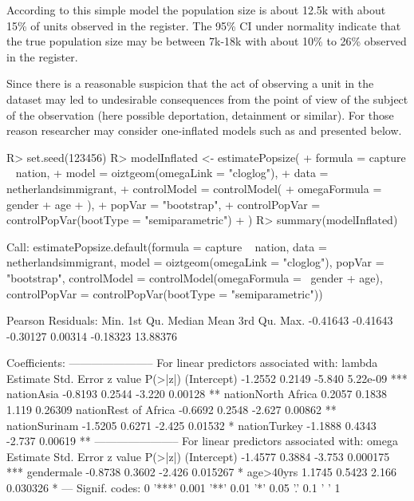 \documentclass[
]{jss}
\newcommand{\1}{\mathcal{I}} \newcommand{\bZero}{\boldsymbol{0}}
\begin{document}
According to this simple model the population size is about 12.5k with
about 15\% of units observed in the register. The 95\% CI under
normality indicate that the true population size may be between 7k-18k
with about 10\% to 26\% observed in the register.

Since there is a reasonable suspicion that the act of observing a unit
in the dataset may led to undesirable consequences from the point of
view of the subject of the observation (here possible deportation,
detainment or similar). For those reason researcher may consider
one-inflated models such as  and presented below.

\begin{CodeChunk}
\begin{CodeInput}
R> set.seed(123456)
R> modelInflated <- estimatePopsize(
+     formula = capture ~ nation,
+     model   = oiztgeom(omegaLink = "cloglog"),
+     data    = netherlandsimmigrant,
+     controlModel = controlModel(
+         omegaFormula = ~ gender + age
+     ),
+     popVar = "bootstrap",
+     controlPopVar = controlPopVar(bootType = "semiparametric")
+ )
R> summary(modelInflated)
\end{CodeInput}
\begin{CodeOutput}

Call:
estimatePopsize.default(formula = capture ~ nation, data = netherlandsimmigrant, 
    model = oiztgeom(omegaLink = "cloglog"), popVar = "bootstrap", 
    controlModel = controlModel(omegaFormula = ~gender + age), 
    controlPopVar = controlPopVar(bootType = "semiparametric"))

Pearson Residuals:
    Min.  1st Qu.   Median     Mean  3rd Qu.     Max. 
-0.41643 -0.41643 -0.30127  0.00314 -0.18323 13.88376 

Coefficients:
-----------------------
For linear predictors associated with: lambda 
                     Estimate Std. Error z value  P(>|z|)    
(Intercept)           -1.2552     0.2149  -5.840 5.22e-09 ***
nationAsia            -0.8193     0.2544  -3.220  0.00128 ** 
nationNorth Africa     0.2057     0.1838   1.119  0.26309    
nationRest of Africa  -0.6692     0.2548  -2.627  0.00862 ** 
nationSurinam         -1.5205     0.6271  -2.425  0.01532 *  
nationTurkey          -1.1888     0.4343  -2.737  0.00619 ** 
-----------------------
For linear predictors associated with: omega 
            Estimate Std. Error z value  P(>|z|)    
(Intercept)  -1.4577     0.3884  -3.753 0.000175 ***
gendermale   -0.8738     0.3602  -2.426 0.015267 *  
age>40yrs     1.1745     0.5423   2.166 0.030326 *  
---
Signif. codes:  0 '***' 0.001 '**' 0.01 '*' 0.05 '.' 0.1 ' ' 1


\end{CodeOutput}
\end{CodeChunk}
\end{document}
